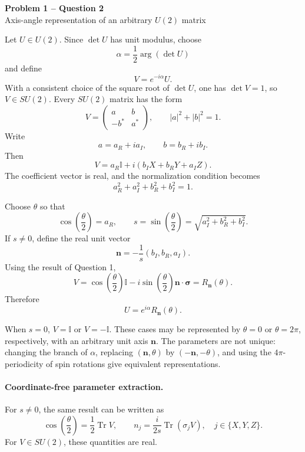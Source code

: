 \documentclass[11pt]{article}
\newcommand{\I}{\mathbb{I}}
\newcommand{\bsigma}{\boldsymbol{\sigma}}
\begin{document}
\begin{center}
  {\Large\bfseries Problem 1 -- Question 2}\\[0.3em]
  {\large Axis-angle representation of an arbitrary \(U(2)\) matrix}
\end{center}

Let \(U\in U(2)\). Since \(\det U\) has unit modulus, choose
\[
 \alpha=\frac{1}{2}\arg(\det U)
\]
and define
\[
 V=e^{-i\alpha}U.
\]
With a consistent choice of the square root of \(\det U\), one has
\(\det V=1\), so \(V\in SU(2)\). Every \(SU(2)\) matrix has the form
\[
 V=
 \begin{pmatrix}
 a&b\\
 -b^*&a^*
 \end{pmatrix},
 \qquad |a|^2+|b|^2=1.
\]
Write
\[
 a=a_R+ia_I,\qquad b=b_R+ib_I.
\]
Then
\[
 V
 =a_R\I+i\left(b_I X+b_RY+a_I Z\right).
\]
The coefficient vector is real, and the normalization condition becomes
\[
 a_R^2+a_I^2+b_R^2+b_I^2=1.
\]

Choose \(\theta\) so that
\[
 \cos\left(\frac{\theta}{2}\right)=a_R,
 \qquad
 s=\sin\left(\frac{\theta}{2}\right)
 =\sqrt{a_I^2+b_R^2+b_I^2}.
\]
If \(s\neq0\), define the real unit vector
\[
 \mathbf n
 =-\frac{1}{s}\left(b_I,b_R,a_I\right).
\]
Using the result of Question 1,
\[
 V
 =\cos\left(\frac{\theta}{2}\right)\I
  -i\sin\left(\frac{\theta}{2}\right)\mathbf n\cdot\bsigma
 =R_{\mathbf n}(\theta).
\]
Therefore
\[
 \boxed{U=e^{i\alpha}R_{\mathbf n}(\theta).}
\]

When \(s=0\), \(V=\I\) or \(V=-\I\). These cases may be represented by
\(\theta=0\) or \(\theta=2\pi\), respectively, with an arbitrary unit axis
\(\mathbf n\). The parameters are not unique: changing the branch of
\(\alpha\), replacing \((\mathbf n,\theta)\) by
\((-\mathbf n,-\theta)\), and using the \(4\pi\)-periodicity of spin
rotations give equivalent representations.

\paragraph{Coordinate-free parameter extraction.}
For \(s\neq0\), the same result can be written as
\[
 \cos\left(\frac{\theta}{2}\right)=\frac{1}{2}\operatorname{Tr}V,
 \qquad
 n_j=\frac{i}{2s}\operatorname{Tr}(\sigma_jV),
 \quad j\in\{X,Y,Z\}.
\]
For \(V\in SU(2)\), these quantities are real.
\end{document}
